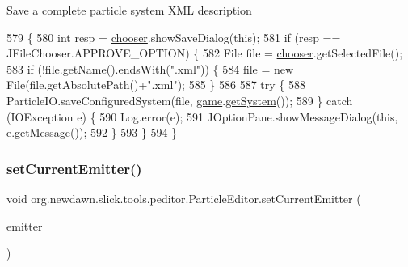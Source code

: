 Save a complete particle system X\+ML description 
\begin{DoxyCode}
579                              \{
580         \textcolor{keywordtype}{int} resp = \mbox{\hyperlink{classorg_1_1newdawn_1_1slick_1_1tools_1_1peditor_1_1_particle_editor_a7a921beab5e50d8482810cf42136ee17}{chooser}}.showSaveDialog(\textcolor{keyword}{this});
581         \textcolor{keywordflow}{if} (resp == JFileChooser.APPROVE\_OPTION) \{
582             File file = \mbox{\hyperlink{classorg_1_1newdawn_1_1slick_1_1tools_1_1peditor_1_1_particle_editor_a7a921beab5e50d8482810cf42136ee17}{chooser}}.getSelectedFile();
583             \textcolor{keywordflow}{if} (!file.getName().endsWith(\textcolor{stringliteral}{".xml"})) \{
584                 file = \textcolor{keyword}{new} File(file.getAbsolutePath()+\textcolor{stringliteral}{".xml"});
585             \}
586             
587             \textcolor{keywordflow}{try} \{
588                 ParticleIO.saveConfiguredSystem(file, \mbox{\hyperlink{classorg_1_1newdawn_1_1slick_1_1tools_1_1peditor_1_1_particle_editor_a30ffb1c9b34c421c0ef6a28efbaaa450}{game}}.\mbox{\hyperlink{classorg_1_1newdawn_1_1slick_1_1tools_1_1peditor_1_1_particle_game_a863b0f3f5c65d561161edf6bfc6c1d8f}{getSystem}}());
589             \} \textcolor{keywordflow}{catch} (IOException e) \{
590                 Log.error(e);
591                 JOptionPane.showMessageDialog(\textcolor{keyword}{this}, e.getMessage());
592             \}
593         \}
594     \}
\end{DoxyCode}
\mbox{\label{classorg_1_1newdawn_1_1slick_1_1tools_1_1peditor_1_1_particle_editor_a1936b46c570aed7d928859f70f04e890}} 
\subsubsection{\texorpdfstring{set\+Current\+Emitter()}{setCurrentEmitter()}}
{\footnotesize\ttfamily void org.\+newdawn.\+slick.\+tools.\+peditor.\+Particle\+Editor.\+set\+Current\+Emitter (\begin{DoxyParamCaption}\item[{\mbox{\hyperlink{classorg_1_1newdawn_1_1slick_1_1particles_1_1_configurable_emitter}{Configurable\+Emitter}}}]{emitter }\end{DoxyParamCaption})\hspace{0.3cm}{\ttfamily [inline]}}

